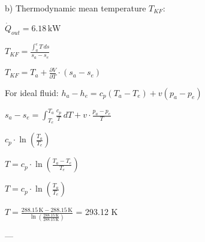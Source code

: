 b) Thermodynamic mean temperature \( T_{KF} \):  

\( \dot{Q}_{out} = 6.18 \, \text{kW} \)  

\( T_{KF} = \frac{\int_a^e T \, ds}{s_a - s_e} \)  

\( T_{KF} = T_{a} + \frac{\partial V}{\partial T} \cdot (s_a - s_e) \)  

For ideal fluid:  
\( h_a - h_e = c_p(T_a - T_e) + v(p_a - p_e) \)  

\( s_a - s_e = \int_{T_e}^{T_a} \frac{c_p}{T} \, dT + v \cdot \frac{p_a - p_e}{T} \)  

\( c_p \cdot \ln \left( \frac{T_a}{T_e} \right) \)  

\( T = c_p \cdot \ln \left( \frac{T_a - T_e}{T_e} \right) \)  

\( T = c_p \cdot \ln \left( \frac{T_a}{T_e} \right) \)  

\( T = \frac{288.15 \, \text{K} - 288.15 \, \text{K}}{\ln \left( \frac{288.15 \, \text{K}}{288.15 \, \text{K}} \right)} \)  
= 293.12 K  

---